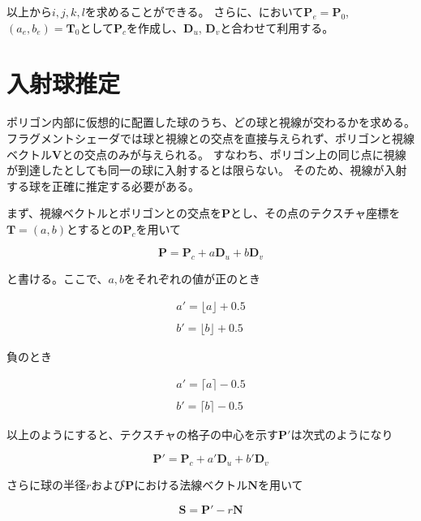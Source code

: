 \noindent
以上から$i,j,k,l$を求めることができる。
さらに、において$\bm{P}_e = \bm{P}_0$, $(a_e, b_e) = \bm{T}_0$として$\bm{P}_c$を作成し、$\bm{D}_u$, $\bm{D}_v$と合わせて利用する。

\section{入射球推定}
\label{SFirstsphere}

ポリゴン内部に仮想的に配置した球のうち、どの球と視線が交わるかを求める。
フラグメントシェーダでは球と視線との交点を直接与えられず、ポリゴンと視線ベクトル$\bm{V}$との交点のみが与えられる。
すなわち、ポリゴン上の同じ点に視線が到達したとしても同一の球に入射するとは限らない。
そのため、視線が入射する球を正確に推定する必要がある。

まず、視線ベクトルとポリゴンとの交点を$\bm{P}$とし、その点のテクスチャ座標を$\bm{T} = (a, b)$とするとの$\bm{P}_c$を用いて

\begin{equation}
\label{EP}
\bm{P} = \bm{P}_c + a\bm{D}_u + b\bm{D}_v
\end{equation}

\noindent
と書ける。ここで、$a, b$をそれぞれの値が正のとき

\begin{eqnarray}
\label{Eadashplus}
a' = \lfloor a \rfloor + 0.5\\
\nonumber\\
\label{Ebdashplus}
b' = \lfloor b \rfloor + 0.5
\end{eqnarray}

\noindent
負のとき

\begin{eqnarray}
\label{Eadashminus}
a' = \lceil a \rceil - 0.5\\
\nonumber\\
\label{Ebdashminus}
b' = \lceil b \rceil - 0.5
\end{eqnarray}

\noindent
以上のようにすると、テクスチャの格子の中心を示す$\bm{P}'$は次式のようになり

\begin{equation}
\bm{P}' = \bm{P}_c + a'\bm{D}_u + b'\bm{D}_v 
\label{EPdash}
\end{equation}

\noindent
さらに球の半径$r$および$\bm{P}$における法線ベクトル$\bm{N}$を用いて

\begin{equation}
\bm{S} = \bm{P}' - r\bm{N} 
\label{ESpherepos}
\end{equation}

